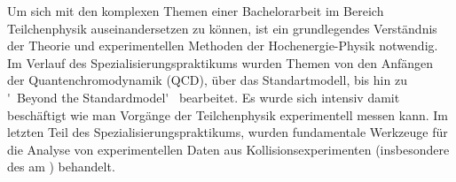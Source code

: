 Um sich mit den komplexen Themen einer Bachelorarbeit im Bereich Teilchenphysik auseinandersetzen zu können, ist ein grundlegendes Verständnis der Theorie und experimentellen Methoden der Hochenergie-Physik notwendig. Im Verlauf des Spezialisierungspraktikums wurden Themen von den Anfängen der Quantenchromodynamik (QCD), über das Standartmodell, bis hin zu \'~Beyond the Standardmodel\'~ bearbeitet. Es wurde sich intensiv damit beschäftigt wie man Vorgänge der Teilchenphysik experimentell messen kann. Im letzten Teil des Spezialisierungspraktikums, wurden fundamentale Werkzeuge für die Analyse von experimentellen Daten aus Kollisionsexperimenten (insbesondere des \lhc am \cern) behandelt.  
